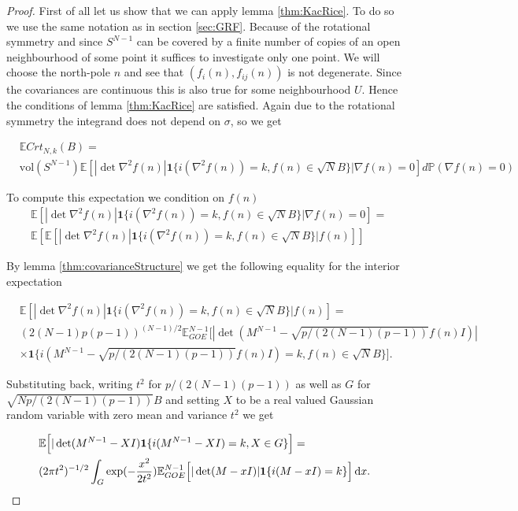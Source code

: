 \begin{proof}
First of all let us show that we can apply lemma \ref{thm:KacRice}. To do so we use the same notation as in section \ref{sec:GRF}. Because of the rotational symmetry and since $S^{N-1}$ can be covered by a finite number of copies of an open neighbourhood of some point it suffices to investigate only one point. We will choose the north-pole $n$ and see that $(f_i(n),f_{ij}(n))$ is not degenerate. Since the covariances are continuous this is also true for some neighbourhood $U$. Hence the conditions of lemma \ref{thm:KacRice} are satisfied. Again due to the rotational symmetry the integrand does not depend on $\sigma$, so we get

\begin{align*}
	&\mathbb E Crt_{N,k}(B)=\\
	&\text{vol}(S^{N-1})\mathbb E[|\det\nabla^2 f(n)|\mathbf 1\{i(\nabla^2 f(n))=k, f(n)\in\sqrt NB\}|\nabla f(n)=0]d\mathbb P(\nabla f(n)=0)
\end{align*}

To compute this expectation we condition on $f(n)$
\begin{align*}
	&\mathbb E[|\det\nabla^2 f(n)|\mathbf 1\{i(\nabla^2 f(n))=k, f(n)\in\sqrt NB\}|\nabla f(n)=0]=\\
	&\mathbb E\left[\mathbb E[|\det\nabla^2 f(n)|\mathbf 1\{i(\nabla^2 f(n))=k,f(n)\in\sqrt NB\}|f(n)]\right]
\end{align*}

By lemma \ref{thm:covarianceStructure} we get the following equality for the interior expectation

\begin{align*}
	&\mathbb E[|\det\nabla^2 f(n)|\mathbf 1\{i(\nabla^2 f(n))=k,f(n)\in\sqrt NB\}|f(n)]=\\
	&(2(N-1)p(p-1))^{(N-1)/2}\mathbb E_{GOE}^{N-1}\Big[|\det(M^{N-1}-\sqrt{p/(2(N-1)(p-1))}f(n)I)|\\&\times\mathbf 1\{i(M^{N-1}-\sqrt{p/(2(N-1)(p-1))}f(n)I)=k,f(n)\in\sqrt NB\}\Big].
\end{align*}

Substituting back, writing $t^2$ for $p/(2(N-1)(p-1))$ as well as $G$ for $\sqrt{Np/(2(N-1)(p-1))}B$ and setting $X$ to be a real valued Gaussian random variable with zero mean and variance $t^2$ we get 

\begin{align}\label{eq:expressEintermsofEGOE}
	&\mathbb E\Big[|\det(M^{N-1}-XI)\mathbf 1\{i(M^{N-1}-XI)=k,X\in G\}\Big]=\nonumber\\
	&(2\pi t^2)^{-1/2}\int_G\exp(-\frac{x^2}{2t^2})\mathbb E_{GOE}^{N-1}\Big[|\det(M-xI)|\mathbf 1\{i(M-xI)=k\}\Big]\mathop{}\!\mathrm{d} x.
\end{align}


\end{proof}
